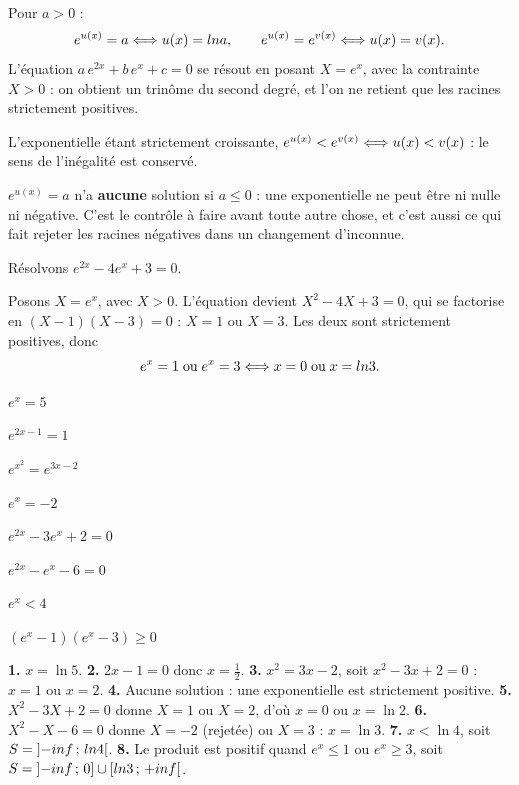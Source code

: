\begin{theoreme}
Pour $a>0$ :
\[
  e^{u(x)} = a \Longleftrightarrow u(x) = ln a, \qquad
  e^{u(x)} = e^{v(x)} \Longleftrightarrow u(x) = v(x).
\]
L'équation $a\,e^{2x}+b\,e^{x}+c = 0$ se résout en posant $X = e^{x}$, avec
la contrainte $X>0$ : on obtient un trinôme du second degré, et l'on ne
retient que les racines strictement positives.
\end{theoreme}

\begin{propriete}[inéquations]
L'exponentielle étant strictement croissante,
$e^{u(x)} < e^{v(x)} \Longleftrightarrow u(x) < v(x)$ : le sens de l'inégalité est
conservé.
\end{propriete}

\begin{avertissement}
$e^{u(x)} = a$ n'a \textbf{aucune} solution si $a \leq 0$ : une exponentielle
ne peut être ni nulle ni négative. C'est le contrôle à faire avant toute
autre chose, et c'est aussi ce qui fait rejeter les racines négatives dans un
changement d'inconnue.
\end{avertissement}

\begin{exemple}
Résolvons $e^{2x}-4e^{x}+3 = 0$.

Posons $X = e^{x}$, avec $X>0$. L'équation devient $X^{2}-4X+3 = 0$, qui se
factorise en $(X-1)(X-3) = 0$ : $X = 1$ ou $X = 3$. Les deux sont
strictement positives, donc
\[
  e^{x} = 1 \;\text{ou}\; e^{x} = 3
  \Longleftrightarrow x = 0 \;\text{ou}\; x = ln 3 .
\]
\end{exemple}

\begin{entrainement}
\exo[\niveau{1}] $e^{x} = 5$

\exo[\niveau{1}] $e^{2x-1} = 1$

\exo[\niveau{2}] $e^{x^{2}} = e^{3x-2}$

\exo[\niveau{2}] $e^{x} = -2$

\exo[\niveau{2}] $e^{2x}-3e^{x}+2 = 0$

\exo[\niveau{3}] $e^{2x}-e^{x}-6 = 0$

\exo[\niveau{3}] $e^{x} < 4$

\exo[\niveau{3}] $\left(e^{x}-1\right)\left(e^{x}-3\right) \geq 0$
\end{entrainement}

\begin{corrige}
\textbf{1.} $x = \ln5$.
\textbf{2.} $2x-1 = 0$ donc $x = \frac12$.
\textbf{3.} $x^{2} = 3x-2$, soit $x^{2}-3x+2 = 0$ : $x = 1$ ou $x = 2$.
\textbf{4.} Aucune solution : une exponentielle est strictement positive.
\textbf{5.} $X^{2}-3X+2 = 0$ donne $X = 1$ ou $X = 2$, d'où $x = 0$ ou
$x = \ln2$.
\textbf{6.} $X^{2}-X-6 = 0$ donne $X = -2$ (rejetée) ou $X = 3$ : $x = \ln3$.
\textbf{7.} $x<\ln4$, soit $S = \left]-inf\,;\,ln4\right[$.
\textbf{8.} Le produit est positif quand $e^{x} \leq 1$ ou $e^{x} \geq 3$,
soit $S = \left]-inf\,;\,0\right]\cup\left[ln3\,;\,+inf\right[$.
\end{corrige}

